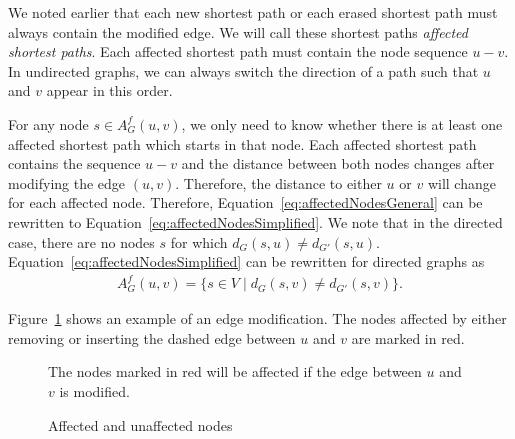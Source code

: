 We noted earlier that each new shortest path or each erased shortest path must always contain the modified edge. We will call these shortest paths \emph{affected shortest paths}. Each affected shortest path must contain the node sequence $u - v$. In undirected graphs, we can always switch the direction of a path such that $u$ and $v$ appear in this order.

For any node $s \in A_G^f(u, v)$, we only need to know whether there is at least one affected shortest path which starts in that node. Each affected shortest path contains the sequence $u - v$ and the distance between both nodes changes after modifying the edge $(u, v)$. Therefore, the distance to either $u$ or $v$ will change for each affected node. Therefore, Equation~\ref{eq:affectedNodesGeneral} can be rewritten to Equation~\ref{eq:affectedNodesSimplified}. We note that in the directed case, there are no nodes $s$ for which $d_G(s, u) \neq d_{G'}(s, u)$. Equation~\ref{eq:affectedNodesSimplified} can be rewritten for directed graphs as
\begin{align}
	A_G^f(u, v) = \{s \in V \mid d_G(s, v) \neq d_{G'}(s, v)\} \label{eq:affectedNodesSimplifiedDirected}.
\end{align}

Figure~\ref{fig:affectedNodes} shows an example of an edge modification. The nodes affected by either removing or inserting the dashed edge between $u$ and $v$ are marked in red.


\begin{figure}[h!]
\centering
{}
\caption{Affected and unaffected nodes}{The nodes marked in red will be affected if the edge between $u$ and $v$ is modified.}
\label{fig:affectedNodes}
\end{figure}



